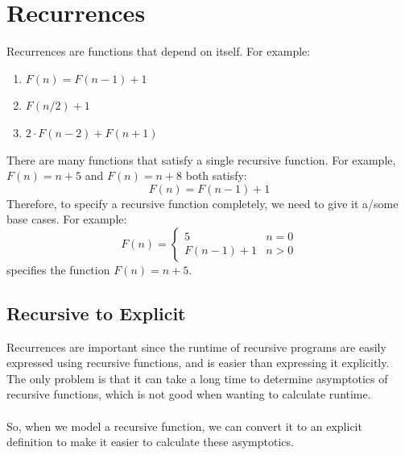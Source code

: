 \documentclass{article}
\begin{document}
\section{Recurrences}
Recurrences are functions that depend on itself. For example:
\begin{enumerate}
    \item $F(n) = F(n - 1) + 1$
    \item $F(n/2) + 1$
    \item $2\cdot F(n - 2) + F(n + 1)$
\end{enumerate}
There are many functions that satisfy a single recursive function. For example, $F(n) = n +5$ and $F(n) = n + 8$ both satisfy: 
$$F(n) = F(n - 1) + 1$$
Therefore, to specify a recursive function completely, we need to give it a/some base cases. For example:
$$F(n) = \begin{cases}
5 & n = 0\\
F(n - 1) + 1 & n > 0
\end{cases}$$
specifies the function $F(n) = n + 5$.

\subsection{Recursive to Explicit}
Recurrences are important since the runtime of recursive programs are easily expressed using recursive functions, and is easier than expressing it explicitly.\\
The only problem is that it can take a long time to determine asymptotics of recursive functions, which is not good when wanting to calculate runtime.\\
\\
So, when we model a recursive function, we can convert it to an explicit definition to make it easier to calculate these asymptotics.
\end{document}

